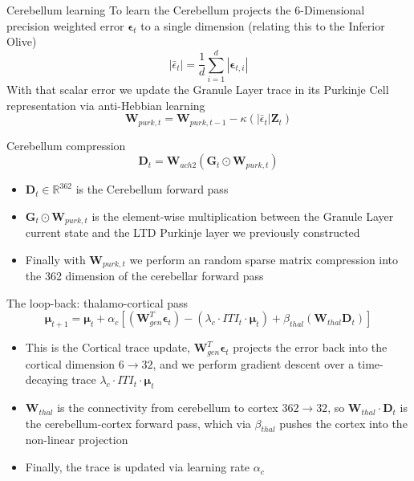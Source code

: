 \documentclass{beamer}
\begin{document}
	\begin{frame}{Cerebellum learning}
		To learn the Cerebellum projects the 6-Dimensional precision weighted error $\boldsymbol{\epsilon}_t$ to a single dimension (relating this to the Inferior Olive)
		\begin{equation}
			\left| \bar{\epsilon}_{t} \right| = \frac{1}{d} \sum_{i=1}^{d} \left| \boldsymbol{\epsilon}_{t, i} \right|
		\end{equation}
		With that scalar error we update the Granule Layer trace in its Purkinje Cell representation via anti-Hebbian learning
		\begin{equation}
			\mathbf{W}_{purk, t} = \mathbf{W}_{purk, t-1} - \kappa ( \left| \bar{\epsilon}_{t} \right| \mathbf{Z}_{t})
		\end{equation}
	\end{frame}
	
	\begin{frame}{Cerebellum compression}
		\begin{equation}
			\mathbf{D}_{t} = \mathbf{W}_{ach2} (\mathbf{G}_{t} \odot \mathbf{W}_{purk, t})
		\end{equation}
		\begin{itemize}
			\item $\mathbf{D}_{t} \in \mathbb{R}^{362}$  is the Cerebellum forward pass
			\item $\mathbf{G}_{t} \odot \mathbf{W}_{purk, t}$ is the element-wise multiplication between the Granule Layer current state and the LTD Purkinje layer we previously constructed
			\item Finally with $\mathbf{W}_{purk, t}$ we perform an random sparse matrix compression into the 362 dimension of the cerebellar forward pass
		\end{itemize}
	\end{frame}
	
	\begin{frame}{The loop-back: thalamo-cortical pass}
		\begin{equation}
			\boldsymbol{\mu}_{t+1} = \boldsymbol{\mu}_{t} + \alpha_{c} \left[(\mathbf{W}^{T}_{gen} \boldsymbol{\epsilon}_{t}) - (\lambda_{c} \cdot ITI_{t} \cdot \boldsymbol{\mu}_{t}) + \beta_{thal} (\mathbf{W}_{thal} \mathbf{D}_{t})\right]
		\end{equation}
		\begin{itemize}
			\item This is the Cortical trace update, $\mathbf{W}^{T}_{gen} \boldsymbol{\epsilon}_{t}$ projects the error back into the cortical dimension $6 \rightarrow 32$, and we perform gradient descent over a time-decaying trace $\lambda_{c} \cdot ITI_{t} \cdot \boldsymbol{\mu}_{t}$
			\item $\mathbf{W}_{thal}$ is the connectivity from cerebellum to cortex $362 \rightarrow 32$, so $\mathbf{W}_{thal} \cdot \mathbf{D}_{t}$ is the cerebellum-cortex forward pass, which via $\beta_{thal}$ pushes the cortex into the non-linear projection
			\item Finally, the trace is updated via learning rate $\alpha_{c}$ 
		\end{itemize}
	\end{frame}
	
\end{document}
